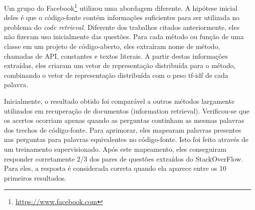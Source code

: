 Um grupo do Facebook\footnote{\url{https://www.facebook.com}}\citep{Sachdev-neural-code-search:2018} utilizou uma abordagem diferente. A hipótese inicial deles é que o código-fonte contém informações suficientes para ser utilizada no problema do \textit{code retrieval}. Diferente dos trabalhos citados anteriormente, eles não fizeram uso inicialmente das questões. Para cada método ou função de uma classe em um projeto de código-aberto, eles extraíram nome de método, chamadas de API, constantes e textos literais. A partir destas informações extraídas, eles criaram um vetor de representação distribuída para o método, combinando o vetor de representação distribuída com o peso \acrshort{tf-idf} de cada palavra. 

Inicialmente, o resultado obtido foi comparável a outros métodos largamente utilizados em recuperação de documentos (information retrieval). Verificou-se que os acertos ocorriam apenas quando as perguntas continham as mesmas palavras dos trechos de código-fonte. Para aprimorar, eles mapearam palavras presentes nas perguntas para palavras equivalentes no código-fonte. Isto foi feito através de um treinamento supervisionado. Após este mapeamento, eles conseguiram responder corretamente 2/3 dos pares de questões extraídos do StackOverFlow. Para eles, a resposta é considerada correta quando ela aparece entre os 10 primeiros resultados.

